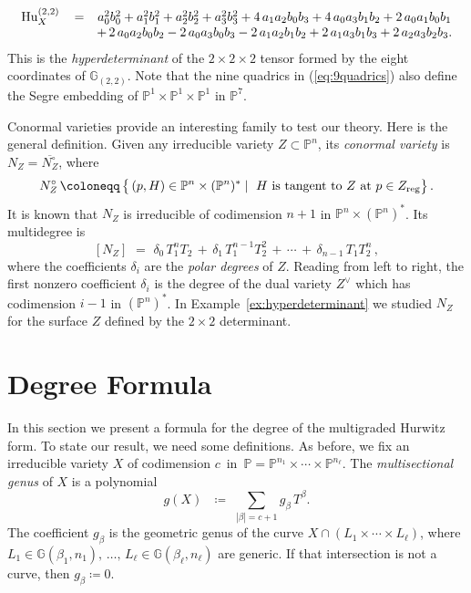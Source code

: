 \documentclass[12pt]{article}
\theoremstyle{definition}
\newenvironment{example}
{\pushQED{\qed}\renewcommand{\qedsymbol}{$\diamond$}\examplex}
{\popQED\endexamplex}
\newcommand{\bG}{\mathbb G}
\newcommand{\bP}{\mathbb P}
\begin{document}
\begin{example}
$$
\begin{matrix} {\rm Hu}^{(2,2)}_X \, &= &
    a_{0}^{2}b_{0}^{2}+a_{1}^{2}b_{1}^{2}+a_{2}^{2}b_{2}^{2}+a_{3}^{2}b_{3}^{2}
     +4\,a_{1}a_{2}b_{0}b_{3}
   +4\,a_{0}a_{3}b_{1}b_{2} 
     +2\,a_{0}a_{1}b_{0}b_{1} \\ & & 
     +\,2\,a_{0}a_{2}b_{0}b_{2}
      -2\,a_{0}a_{3}b_{0}b_{3}
    -2\,a_{1}a_{2}b_{1}b_{2}
      +2\,a_{1}a_{3}b_{1}b_{3}
   +2\,a_{2}a_{3}b_{2}b_{3}.
\end{matrix}
$$
This is the {\em hyperdeterminant} of the $2 \times 2 \times 2$ tensor
formed by the eight coordinates of $\bG_{(2,2)}$.
Note that the nine quadrics in (\ref{eq:9quadrics}) also define the
Segre embedding of $\bP^1 \times \bP^1 \times \bP^1$ in $\bP^7$.
\end{example}

Conormal varieties provide an interesting family to test
 our theory. Here is the general definition.
Given any irreducible variety $Z\subset\bP^n$, its \emph{conormal variety}  is $N_Z=\overline{N_Z^{\circ}}$, where
\[
    N_Z^{\circ}\,\coloneqq\,\bigl\{\,(p,H)\in\bP^n\times(\bP^n)^*\mid\text{
    $H$ is tangent to $Z$ at 
    $p\in Z_{\rm reg}$}\bigr\}\,.
\]
It is known that $N_Z$ is irreducible of codimension $n+1$ in $\bP^n\times(\bP^n)^*$. Its multidegree is
\[
    [N_Z] \,\,=\,\, \delta_0\,T_1^nT_2\,+\,\delta_1\,T_1^{n-1}T_2^2\,+\,\cdots\,+\,\delta_{n-1}\,T_1T_2^n\,,
\]
where the coefficients $\delta_i$ are the \emph{polar degrees} of $Z$. Reading from left to right, the first nonzero coefficient $\delta_i$ is the degree of the dual variety $Z^\vee$ which has codimension $i-1$ in $(\bP^n)^*$.
In Example~\ref{ex:hyperdeterminant}
we studied $N_Z$ for the surface $Z$ defined by the
$2 \times 2$ determinant.

\section{Degree Formula}
\label{sec3} 

In this section we present a formula for the degree of the multigraded Hurwitz form.
To state our result, we need some definitions. As before, we fix an irreducible
variety $X$ of codimension $c\,$ in $\,\bP = \bP^{n_1}  \times \cdots \times \bP^{n_\ell}$.
The \emph{multisectional genus} of $X$ is a polynomial
\begin{equation} \label{eq:msg}
 g(X)\,\,\,\, \coloneqq \,\,\sum_{|\beta| = c+1} \!
 \! g_{\beta}\,T^\beta. 
 \end{equation}
The coefficient $g_\beta$ is the geometric genus of the curve $X\cap (L_1\times\cdots\times L_\ell)$,
where $L_1 \in \bG(\beta_1,n_1),\, \ldots, \, L_\ell \in \bG(\beta_\ell,n_\ell)$ are generic.
If that intersection is not a curve, then  $g_\beta\coloneqq 0$.
\end{document}
